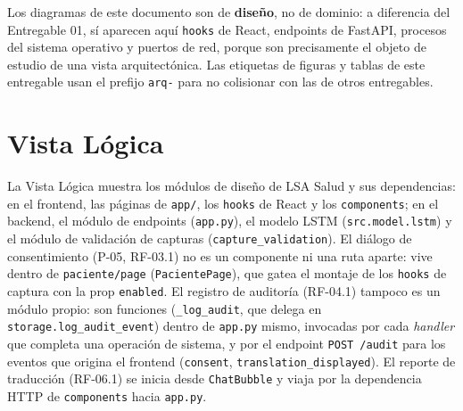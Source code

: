 Los diagramas de este documento son de \textbf{diseño}, no de dominio: a
diferencia del Entregable 01, sí aparecen aquí \texttt{hooks} de React,
endpoints de FastAPI, procesos del sistema operativo y puertos de red, porque
son precisamente el objeto de estudio de una vista arquitectónica. Las
etiquetas de figuras y tablas de este entregable usan el prefijo
\texttt{arq-} para no colisionar con las de otros entregables.

\section{Vista Lógica}
\label{sec:vista-logica}

La Vista Lógica muestra los módulos de diseño de LSA Salud y sus
dependencias: en el frontend, las páginas de \texttt{app/}, los
\texttt{hooks} de React y los \texttt{components}; en el backend, el
módulo de endpoints (\texttt{app.py}), el modelo LSTM
(\texttt{src.model.lstm}) y el módulo de validación de capturas
(\texttt{capture\_validation}). El diálogo de consentimiento (P-05, RF-03.1)
no es un componente ni una ruta aparte: vive dentro de
\texttt{paciente/page} (\texttt{PacientePage}), que gatea el montaje de los
\texttt{hooks} de captura con la prop \texttt{enabled}. El registro de
auditoría (RF-04.1) tampoco es un módulo propio: son funciones
(\texttt{\_log\_audit}, que delega en \texttt{storage.log\_audit\_event}) dentro de
\texttt{app.py} mismo, invocadas por cada \textit{handler} que completa una operación de
sistema, y por el endpoint \texttt{POST /audit} para los eventos que origina
el frontend (\texttt{consent}, \texttt{translation\_displayed}). El reporte
de traducción (RF-06.1) se inicia desde \texttt{ChatBubble} y viaja por la
dependencia HTTP de \texttt{components} hacia \texttt{app.py}.


